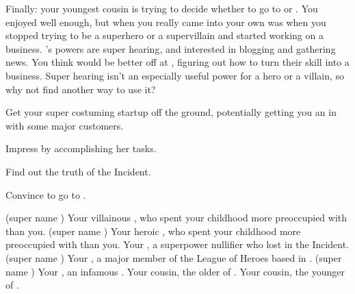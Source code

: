 \documentclass[char]{LRSguildcamp1}
\begin{document}
Finally: your youngest cousin \cTween{} is trying to decide whether to go to \pSuperSchool{} or \pNormalSchool{}.  You enjoyed \pSuperSchool{} well enough, but when you really came into your own was when you stopped trying to be a superhero or a supervillain and started working on a business.  \cTween{}'s powers are super hearing, and \cTween{\theyare} interested in blogging and gathering news.  You think \cTween{\they} would be better off at \pNormalSchool{}, figuring out how to turn their skill into a business.  Super hearing isn't an especially useful power for a hero or a villain, so why not find another way to use it?

\begin{itemz}[Goals]
	\item Get your super costuming startup off the ground, potentially getting you an in with some major customers.
	\item Impress \cGrandma{} by accomplishing her tasks.
	\item Find out the truth of the \pCityO{} Incident.
	\item Convince \cTween{} to go to \pNormalSchool{}.
\end{itemz}

\begin{itemz}[Notes]
	\item 
\end{itemz}

\begin{contacts}
	\contact{\cOldest{\intro}} (super name \cOldest{\MYsupername}) Your villainous \cOldest{\parent}, who spent your childhood more preoccupied with \cOS{} than you.
	\contact{\cOS{\intro}} (super name \cOS{\MYsupername}) Your heroic \cOS{\parent}, who spent your childhood more preoccupied with \cOldest{} than you.
	\contact{\cArchitect{\intro}} Your \cArchitect{\uncle}, a superpower nullifier who lost \cArchitect{\their} \cAS{\spouse} in the \pCityO{} Incident.
	\contact{\cYoungest{\intro}}  (super name \cYoungest{\MYsupername}) Your \cYoungest{\uncle}, a major member of the League of Heroes based in \pCityYoungest{}.
	\contact{\cGrandma{\intro}}  (super name \cGrandma{\MYsupername}) Your \cGrandma{\grandparent}, an infamous \cGrandma{\villain}.
	\contact{\cTeen{\intro}} Your cousin, the older \cTeen{\offspring} of \cArchitect{\Uncle} \cArchitect{}.
	\contact{\cTween{\intro}} Your cousin, the younger \cTween{\offspring} of \cArchitect{\Uncle} \cArchitect{}.
\end{contacts}
\end{document}
